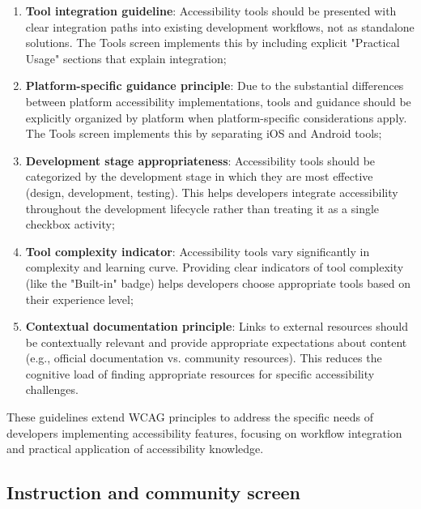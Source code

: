 \begin{enumerate}
    \item \textbf{Tool integration guideline}: Accessibility tools should be presented with clear integration paths into existing development workflows, not as standalone solutions. The Tools screen implements this by including explicit "Practical Usage" sections that explain integration;
    
    \item \textbf{Platform-specific guidance principle}: Due to the substantial differences between platform accessibility implementations, tools and guidance should be explicitly organized by platform when platform-specific considerations apply. The Tools screen implements this by separating iOS and Android tools;
    
    \item \textbf{Development stage appropriateness}: Accessibility tools should be categorized by the development stage in which they are most effective (design, development, testing). This helps developers integrate accessibility throughout the development lifecycle rather than treating it as a single checkbox activity;
    
    \item \textbf{Tool complexity indicator}: Accessibility tools vary significantly in complexity and learning curve. Providing clear indicators of tool complexity (like the "Built-in" badge) helps developers choose appropriate tools based on their experience level;
    
    \item \textbf{Contextual documentation principle}: Links to external resources should be contextually relevant and provide appropriate expectations about content (e.g., official documentation vs. community resources). This reduces the cognitive load of finding appropriate resources for specific accessibility challenges.
\end{enumerate}

These guidelines extend WCAG principles to address the specific needs of developers implementing accessibility features, focusing on workflow integration and practical application of accessibility knowledge.

\subsection{Instruction and community screen}
\label{subsec:instruction-community-screen}


